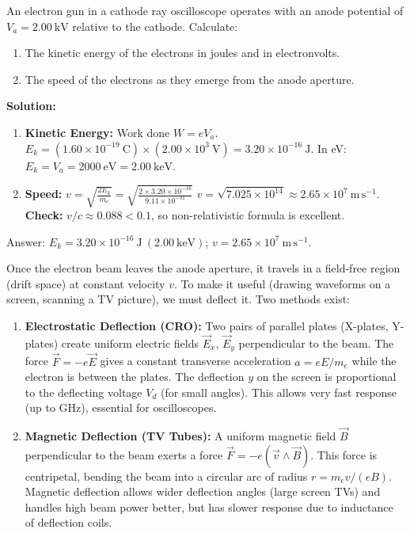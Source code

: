 \documentclass[11pt]{article}
\newcommand{\cle}[1]{{\popxbold\color{popdark}#1}}
\newcounter{popsec}
\newcounter{popsub}
\newcommand{\courssub}[1]{%
  \stepcounter{popsub}%
  \par\vspace{9pt}\noindent{\popxbold\fontsize{11.5}{13}\selectfont\color{popink}{\color{poporange}\thepopsec.\thepopsub}\hspace{6pt}#1}\par\nopagebreak\vspace{4pt}
}
\begin{document}
\begin{exoresolu}
An electron gun in a cathode ray oscilloscope operates with an anode potential of $V_a = 2.00\ \mathrm{kV}$ relative to the cathode. Calculate:
\begin{enumerate}
\item The kinetic energy of the electrons in joules and in electronvolts.
\item The speed of the electrons as they emerge from the anode aperture.
\end{enumerate}
\tcblower
\textbf{Solution:}
\begin{enumerate}
\item \textbf{Kinetic Energy:}
Work done $W = e V_a$.
$E_k = (1.60 \times 10^{-19}\ \mathrm{C}) \times (2.00 \times 10^3\ \mathrm{V}) = 3.20 \times 10^{-16}\ \mathrm{J}$.
In eV: $E_k = V_a = 2000\ \mathrm{eV} = 2.00\ \mathrm{keV}$.
\item \textbf{Speed:}
$v = \sqrt{\frac{2 E_k}{m_e}} = \sqrt{\frac{2 \times 3.20 \times 10^{-16}}{9.11 \times 10^{-31}}}$
$v = \sqrt{7.025 \times 10^{14}} \approx 2.65 \times 10^7\ \mathrm{m\,s^{-1}}$.
\textbf{Check:} $v/c \approx 0.088 < 0.1$, so non-relativistic formula is excellent.
\end{enumerate}
\cle{Answer:} $E_k = 3.20 \times 10^{-16}\ \mathrm{J}\ (2.00\ \mathrm{keV})$; $v = 2.65 \times 10^7\ \mathrm{m\,s^{-1}}$.
\end{exoresolu}

\courssub{Deflection of the Electron Beam}

Once the electron beam leaves the anode aperture, it travels in a field-free region (drift space) at constant velocity $v$. To make it useful (drawing waveforms on a screen, scanning a TV picture), we must deflect it. Two methods exist:

\begin{enumerate}
\item \textbf{Electrostatic Deflection (CRO):} Two pairs of parallel plates (X-plates, Y-plates) create uniform electric fields $\vec{E}_x$, $\vec{E}_y$ perpendicular to the beam. The force $\vec{F} = -e\vec{E}$ gives a constant transverse acceleration $a = eE/m_e$ while the electron is between the plates. The deflection $y$ on the screen is proportional to the deflecting voltage $V_d$ (for small angles). This allows very fast response (up to GHz), essential for oscilloscopes.
\item \textbf{Magnetic Deflection (TV Tubes):} A uniform magnetic field $\vec{B}$ perpendicular to the beam exerts a force $\vec{F} = -e(\vec{v} \wedge \vec{B})$. This force is centripetal, bending the beam into a circular arc of radius $r = m_e v / (e B)$. Magnetic deflection allows wider deflection angles (large screen TVs) and handles high beam power better, but has slower response due to inductance of deflection coils.
\end{enumerate}
\end{document}
